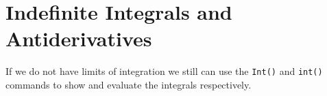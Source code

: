 \begin{maplegroup}
\begin{mapleinput}
\end{mapleinput}
\mapleresult
\begin{maplelatex}
\end{maplelatex}
\end{maplegroup}
\begin{maplegroup}
\begin{mapleinput}
\end{mapleinput}
\mapleresult
{}
\end{maplegroup}
\begin{maplegroup}
\begin{mapleinput}
\end{mapleinput}
\mapleresult
\begin{maplelatex}
\end{maplelatex}
\end{maplegroup}
\begin{maplegroup}
\begin{mapleinput}
\end{mapleinput}
\mapleresult
\begin{maplelatex}
\end{maplelatex}
\end{maplegroup}

\section{Indefinite Integrals and Antiderivatives}
\label{sec:indefinite_integrals_and_antiderivatives}

If we do not have limits of integration we still can use the \texttt{Int()} and \texttt{int()} commands to show and evaluate the integrals respectively.


